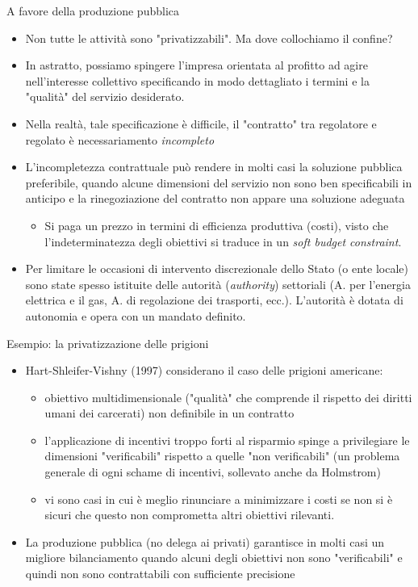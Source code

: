 \documentclass[aspectratio=149,11pt]{beamer}
\begin{document}
\begin{frame}{A favore della produzione pubblica}
\begin{itemize}
\item Non tutte le attività sono "privatizzabili". Ma dove collochiamo il confine?
\item In astratto, possiamo spingere l'impresa orientata al profitto ad agire
nell'interesse collettivo specificando in modo dettagliato i termini e la
"qualità" del servizio desiderato.
\item Nella realtà, tale specificazione è difficile, il "contratto" tra regolatore
e regolato è necessariamento \emph{incompleto}
\item L'\alert{incompletezza contrattuale} può rendere in molti casi la soluzione
pubblica preferibile, quando alcune dimensioni del servizio non sono ben
specificabili in anticipo e la rinegoziazione del contratto non appare una
soluzione adeguata
\begin{itemize}
\item Si paga un prezzo in termini di efficienza produttiva (costi), visto che
l'indeterminatezza degli obiettivi si traduce in un \emph{soft budget
constraint}.
\end{itemize}
\item Per limitare le occasioni di intervento discrezionale dello Stato (o ente
locale) sono state spesso istituite delle autorità (\emph{authority}) settoriali (A. per
l'energia elettrica e il gas, A. di regolazione dei trasporti,
ecc.). L'autorità è dotata di autonomia e opera con un mandato definito.
\end{itemize}
\end{frame}

\begin{frame}{Esempio: la privatizzazione delle prigioni}
\begin{itemize}
\item Hart-Shleifer-Vishny (1997) considerano il caso delle prigioni americane:
\begin{itemize}
\item obiettivo multidimensionale ("qualità" che comprende il rispetto dei
diritti umani dei carcerati) non definibile in un contratto
\item l'applicazione di incentivi troppo forti al risparmio spinge a
privilegiare le dimensioni "verificabili" rispetto a quelle "non
verificabili" (un problema generale di ogni schame di incentivi, sollevato
anche da Holmstrom)
\item vi sono casi in cui è meglio rinunciare a minimizzare i costi se non si è
sicuri che questo non comprometta altri obiettivi rilevanti.
\end{itemize}
\item La produzione pubblica (no delega ai privati) garantisce in molti casi un
migliore bilanciamento quando alcuni degli obiettivi non sono "verificabili"
e quindi non sono contrattabili con sufficiente precisione
\end{itemize}
\end{frame}
\end{document}
